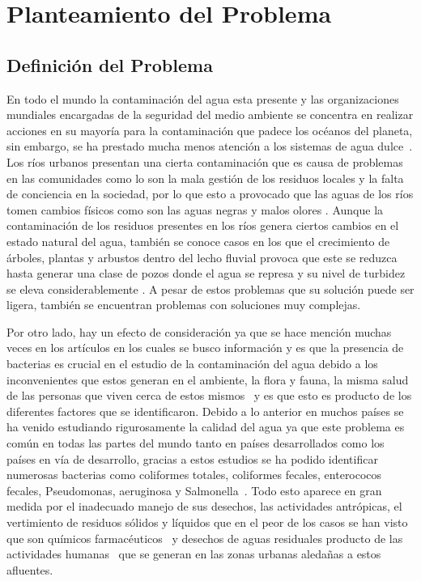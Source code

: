 \section{Planteamiento del Problema}
\subsection{Definición del Problema}
En todo el mundo la contaminación del agua esta presente y las organizaciones mundiales encargadas de la seguridad del medio ambiente se concentra en realizar acciones en su mayoría para la contaminación que padece los océanos del planeta, sin embargo, se ha prestado mucha menos atención a los sistemas de agua dulce~\cite{Blettler2017}. Los ríos urbanos presentan una cierta contaminación que es causa de problemas en las comunidades como lo son la mala gestión de los residuos locales y la falta de conciencia en la sociedad, por lo que esto a provocado que las aguas de los ríos tomen cambios físicos como son las aguas negras y malos olores \cite{Gastezzi-Arias2016}. Aunque la contaminación de los residuos presentes en los ríos genera ciertos cambios en el estado natural del agua, también se conoce casos en los que el crecimiento de árboles, plantas y arbustos dentro del lecho fluvial provoca que este se reduzca hasta generar una clase de pozos donde el agua se represa y su nivel de turbidez se eleva considerablemente \cite{Stepien2019}. A pesar de estos problemas que su solución puede ser ligera, también se encuentran problemas con soluciones muy complejas.

Por otro lado, hay un efecto de consideración ya que se hace mención muchas veces en los artículos en los cuales se busco información y es que la presencia de bacterias es crucial en el estudio de la contaminación del agua debido a los inconvenientes que estos generan en el ambiente, la flora y fauna, la misma salud de las personas que viven cerca de estos mismos~\cite{MendozaCarino2014} y es que esto es producto de los diferentes factores que se identificaron. Debido a lo anterior en muchos países se ha venido estudiando rigurosamente la calidad del agua ya que este problema es común en todas las partes del mundo tanto en países desarrollados como los países en vía de desarrollo, gracias a estos estudios se ha podido identificar numerosas bacterias como coliformes totales, coliformes fecales, enterococos fecales, Pseudomonas, aeruginosa y Salmonella~\cite{}. Todo esto aparece en gran medida por el inadecuado manejo de sus desechos, las actividades antrópicas, el vertimiento de residuos sólidos y líquidos que en el peor de los casos se han visto que son químicos farmacéuticos~\cite{Garcia-Morales2021} y desechos de aguas residuales producto de las actividades humanas~\cite {Ahumada-Santos2014} que se generan en las zonas urbanas aledañas a estos afluentes.

